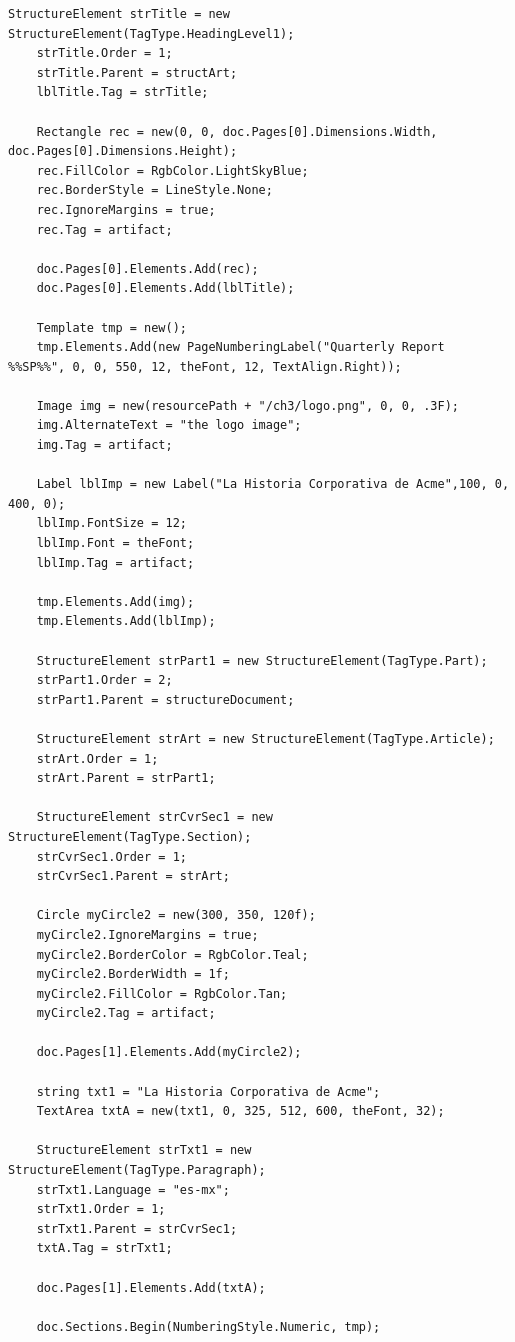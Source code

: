 \documentclass[american,letterpaper]{tufte-book}
\numberwithin{equation}{section}
\numberwithin{figure}{section}
\begin{document}
{{\begin{lstlisting}[caption={Identifying items as artifacts to avoid tagging.},label={lis:Identifying-items-as},basicstyle={\small\ttfamily},breaklines=true]
    StructureElement strTitle = new StructureElement(TagType.HeadingLevel1);
    strTitle.Order = 1;
    strTitle.Parent = structArt;
    lblTitle.Tag = strTitle;

    Rectangle rec = new(0, 0, doc.Pages[0].Dimensions.Width, doc.Pages[0].Dimensions.Height);
    rec.FillColor = RgbColor.LightSkyBlue;
    rec.BorderStyle = LineStyle.None;
    rec.IgnoreMargins = true;
    rec.Tag = artifact;

    doc.Pages[0].Elements.Add(rec);
    doc.Pages[0].Elements.Add(lblTitle);

    Template tmp = new();
    tmp.Elements.Add(new PageNumberingLabel("Quarterly Report  %%SP%%", 0, 0, 550, 12, theFont, 12, TextAlign.Right));

    Image img = new(resourcePath + "/ch3/logo.png", 0, 0, .3F);
    img.AlternateText = "the logo image";
    img.Tag = artifact;

    Label lblImp = new Label("La Historia Corporativa de Acme",100, 0, 400, 0);
    lblImp.FontSize = 12;
    lblImp.Font = theFont;
    lblImp.Tag = artifact;

    tmp.Elements.Add(img);
    tmp.Elements.Add(lblImp);

    StructureElement strPart1 = new StructureElement(TagType.Part);
    strPart1.Order = 2;
    strPart1.Parent = structureDocument;

    StructureElement strArt = new StructureElement(TagType.Article);
    strArt.Order = 1;
    strArt.Parent = strPart1;

    StructureElement strCvrSec1 = new StructureElement(TagType.Section);
    strCvrSec1.Order = 1;
    strCvrSec1.Parent = strArt;

    Circle myCircle2 = new(300, 350, 120f);
    myCircle2.IgnoreMargins = true;
    myCircle2.BorderColor = RgbColor.Teal;
    myCircle2.BorderWidth = 1f;
    myCircle2.FillColor = RgbColor.Tan;
    myCircle2.Tag = artifact;

    doc.Pages[1].Elements.Add(myCircle2);

    string txt1 = "La Historia Corporativa de Acme";
    TextArea txtA = new(txt1, 0, 325, 512, 600, theFont, 32);

    StructureElement strTxt1 = new StructureElement(TagType.Paragraph);
    strTxt1.Language = "es-mx";
    strTxt1.Order = 1;
    strTxt1.Parent = strCvrSec1;
    txtA.Tag = strTxt1;

    doc.Pages[1].Elements.Add(txtA);

    doc.Sections.Begin(NumberingStyle.Numeric, tmp);


\end{lstlisting}}}
\end{document}
